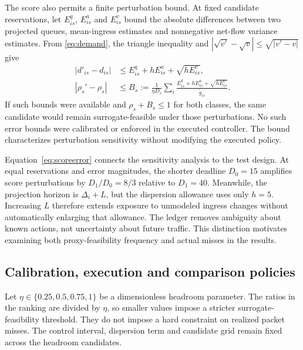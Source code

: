 \documentclass{IEEEoj}
\begin{document}
The score also permits a finite perturbation bound. At fixed candidate
reservations, let $E^q_{is}$, $E^a_{is}$ and $E^v_{is}$ bound the absolute
differences between two projected queues, mean-ingress estimates and
nonnegative net-flow variance estimates. From \eqref{eq:demand}, the triangle
inequality and $|\sqrt{v'}-\sqrt v|\le\sqrt{|v'-v|}$ give
\begin{align}
 |d'_{is}-d_{is}|&\le E^q_{is}+hE^a_{is}+\sqrt{hE^v_{is}},
 \label{eq:demanderror}\\
 |\rho_s'-\rho_s|&\le B_s
 :=\frac1{\eta D_s}\sum_i
 \frac{E^q_{is}+hE^a_{is}+\sqrt{hE^v_{is}}}{\widetilde g_{is}}.
 \label{eq:scoreerror}
\end{align}
If such bounds were available and $\rho_s+B_s\le1$ for both classes, the
same candidate would remain surrogate-feasible under those perturbations.
No such error bounds were calibrated or enforced in the executed controller.
The bound characterizes perturbation sensitivity without modifying the executed policy.

Equation~\eqref{eq:scoreerror} connects the sensitivity analysis to the test
design. At equal reservations and error magnitudes, the shorter deadline
$D_0=15$ amplifies score perturbations by $D_1/D_0=8/3$ relative to $D_1=40$.
Meanwhile, the projection horizon is $\Delta_i+L$, but the dispersion allowance
uses only $h=5$. Increasing $L$ therefore extends exposure to unmodeled
ingress changes without automatically enlarging that allowance. The ledger
removes ambiguity about known actions, not uncertainty about future traffic.
This distinction motivates examining both proxy-feasibility frequency and
actual misses in the results.
\subsection{Calibration, execution and comparison policies}
Let $\eta\in\{0.25,0.5,0.75,1\}$ be a dimensionless headroom parameter.
The ratios in the ranking are divided by $\eta$, so smaller values impose a
stricter surrogate-feasibility threshold. They do not impose a hard constraint
on realized packet misses. The control interval, dispersion term and candidate
grid remain fixed across the headroom candidates.
\end{document}
